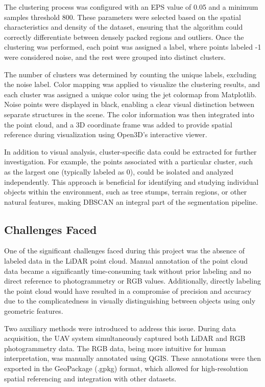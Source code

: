 \documentclass[../report.tex]{subfiles}
\begin{document}
    The clustering process was configured with an EPS value of 0.05 and a minimum samples threshold 800. These parameters were selected based on the spatial characteristics and density of the dataset, ensuring that the algorithm could correctly differentiate between densely packed regions and outliers. Once the clustering was performed, each point was assigned a label, where points labeled -1 were considered noise, and the rest were grouped into distinct clusters.
    
    The number of clusters was determined by counting the unique labels, excluding the noise label. Color mapping was applied to visualize the clustering results, and each cluster was assigned a unique color using the jet colormap from Matplotlib. Noise points were displayed in black, enabling a clear visual distinction between separate structures in the scene. The color information was then integrated into the point cloud, and a 3D coordinate frame was added to provide spatial reference during visualization using Open3D’s interactive viewer.
    
    In addition to visual analysis, cluster-specific data could be extracted for further investigation. For example, the points associated with a particular cluster, such as the largest one (typically labeled as 0), could be isolated and analyzed independently. This approach is beneficial for identifying and studying individual objects within the environment, such as tree stumps, terrain regions, or other natural features, making DBSCAN an integral part of the segmentation pipeline.
	\subsection{Challenges Faced}
    One of the significant challenges faced during this project was the absence of labeled data in the LiDAR point cloud. Manual annotation of the point cloud data became a significantly time-consuming task without prior labeling and no direct reference to photogrammetry or RGB values. Additionally, directly labeling the point cloud would have resulted in a compromise of precision and accuracy due to the complicatedness in visually distinguishing between objects using only geometric features.

    Two auxiliary methods were introduced to address this issue. During data acquisition, the UAV system simultaneously captured both LiDAR and RGB photogrammetry data. The RGB data, being more intuitive for human interpretation, was manually annotated using QGIS. These annotations were then exported in the GeoPackage (.gpkg) format, which allowed for high-resolution spatial referencing and integration with other datasets.
    
\end{document}
